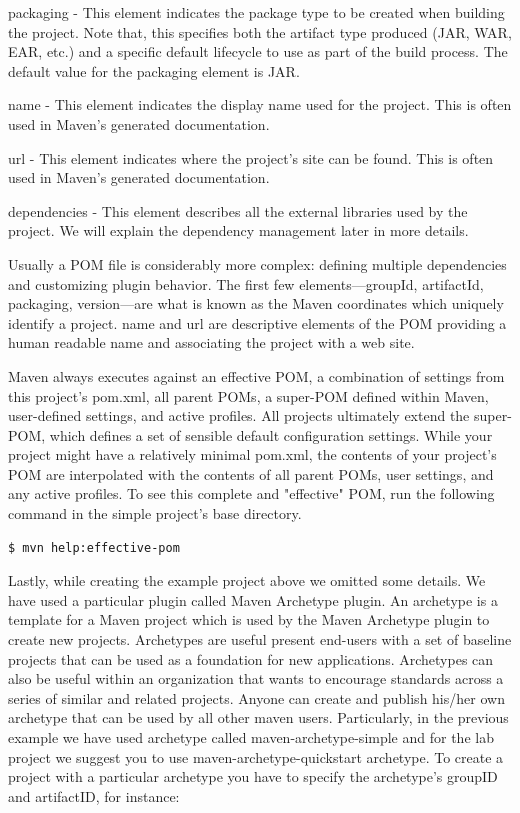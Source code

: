\documentclass{article}
\begin{document}
\begin{compactitem}
\item packaging - This element indicates the package type to be
  created when building the project. Note that, this specifies both
  the artifact type produced (JAR, WAR, EAR, etc.) and a
  specific default lifecycle to use as part of the build process.
  The default value for the packaging element is JAR.

\item name - This element indicates the display name used for the
  project. This is often used in Maven's generated documentation. 

\item url - This element indicates where the project's site can be
  found. This is often used in Maven's generated documentation.

\item dependencies - This element describes all the external libraries
  used by the project. We will explain the dependency management later
  in more details.
\end{compactitem}

Usually a POM file is considerably more complex: defining multiple
dependencies and customizing plugin behavior. The first few
elements—groupId, artifactId, packaging, version—are what is known as
the Maven coordinates which uniquely identify a project. name and url
are descriptive elements of the POM providing a human readable name
and associating the project with a web site.

Maven always executes against an effective POM, a combination of
settings from this project’s pom.xml, all parent POMs, a super-POM
defined within Maven, user-defined settings, and active profiles. All
projects ultimately extend the super-POM, which defines a set of
sensible default configuration settings. While your project might have
a relatively minimal pom.xml, the contents of your project’s POM are
interpolated with the contents of all parent POMs, user settings, and
any active profiles. To see this complete and "effective" POM, run the
following command in the simple project’s base directory.
\begin{lstlisting}
$ mvn help:effective-pom
\end{lstlisting}

Lastly, while creating the example project above we omitted some
details. We have used a particular plugin called Maven Archetype
plugin.
An archetype is a template for a Maven project which is used by the
Maven Archetype plugin to create new projects. Archetypes are useful
present end-users with a set of baseline projects that can be
used as a foundation for new applications. Archetypes can also be
useful within an organization that wants to encourage standards across
a series of similar and related projects. Anyone can create and publish
his/her own archetype that can be used by all other maven users.
Particularly, in the previous example we have used archetype called
maven-archetype-simple and for the lab project we suggest you to use
maven-archetype-quickstart archetype.
To create a project with a particular archetype you have to specify
the archetype's groupID and artifactID, for instance:
\end{document}
